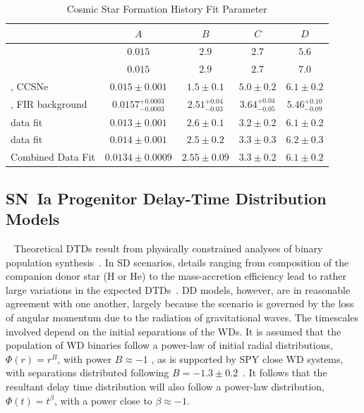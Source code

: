 \documentclass[apj, twocolumn]{aastex62}
\begin{document}
\begin{table}[t]
    \centering
    \caption{Cosmic Star Formation History Fit Parameter}
    \label{tab:csfh_fits}
    \begin{tabular}{lcccc}
         & $A$ & $B$ & $C$ & $D$ \\
        \hline
        \hline
	\cite{Madau:2014fk} & $0.015$ & $2.9$ & $2.7$ & $5.6$\\
	\cite{Finkelstein:2014fj} & $0.015$ & $2.9$ & $2.7$ & $7.0$\\
	\cite{Strolger:2015aa}, CCSNe& $0.015 \pm 0.001$ & $1.5 \pm 0.1$ & $5.0 \pm 0.2$ & $6.1 \pm 0.2$\\
	\cite{Wu:2018qy}, FIR background& $0.0157^{+0.0003}_{-0.0003}$ & $2.51^{+0.04}_{-0.03}$ & $3.64^{+0.04}_{-0.05}$ & $5.46^{+0.10}_{-0.09}$\\
	\hline
	\cite{Madau:2014fk}\tablenotemark{a} data fit& $0.013 \pm 0.001$ & $2.6 \pm 0.1$ & $3.2 \pm 0.2$ & $6.1 \pm 0.2$\\
	\cite{Driver:2018nr}\tablenotemark{b} data fit& $0.014 \pm 0.001$ & $2.5 \pm 0.2$ & $3.3 \pm 0.3$ & $6.2 \pm 0.3$\\
	\hline
	Combined Data Fit & $0.0134 \pm 0.0009$ & $2.55 \pm 0.09$ & $3.3 \pm 0.2$ & $6.1 \pm 0.2$\\
	\hline
    \end{tabular}
\end{table}
 
\subsection{SN~Ia Progenitor Delay-Time Distribution Models}~\label{sec:dtd}
Theoretical DTDs result from physically constrained analyses of binary population synthesis~\cite[see][ for a review]{Wang:2012a}.  In SD scenarios, details ranging from composition of the companion donor star (H or He) to the mass-accretion efficiency lead to rather large variations in the expected DTDs~\cite{Nelemans:2013}. DD models, however, are in reasonable agreement with one another, largely because the scenario is governed by the loss of angular momentum due to the radiation of gravitational waves. The timescales involved depend on the  initial separations of the WDs. It is assumed that the population of WD binaries follow a power-law of initial radial distributions, $\Phi(r)=r^{B}$, with power $B\approx-1$ \citep{Opik:1924xr}, as is supported by SPY close WD systems, with separations distributed following $B=-1.3\pm0.2$~\citep{Maoz:2017zl, Maoz:2018eu}. It follows that the resultant delay time distribution will also follow a power-law distribution, $\Phi(t)=t^{\beta}$, with a power close to $\beta\approx-1$.
\end{document}
